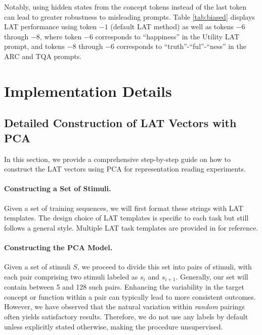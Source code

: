 Notably, using hidden states from the concept tokens instead of the last token can lead to greater robustness to misleading prompts.
Table \ref{tab:biased} displays LAT performance using token $-1$ (default LAT method) as well as tokens $-6$ through $-8$, where token $-6$ corresponds to ``happiness'' in the Utility LAT prompt, and tokens $-8$ through $-6$ corresponds to ``truth''-``ful''-``ness'' in the ARC and TQA prompts.














    









\section{Implementation Details} \label{sec:implementation_details}
\subsection{Detailed Construction of LAT Vectors with PCA}
\label{sec:lat_pca_details}


In this section, we provide a comprehensive step-by-step guide on how to construct the LAT vectors using PCA for representation reading experiments.

\paragraph{Constructing a Set of Stimuli.} Given a set of training sequences, we will first format these strings with LAT templates. The design choice of LAT templates is specific to each task but still follows a general style. Multiple LAT task templates are provided in  for reference.


\paragraph{Constructing the PCA Model.}
Given a set of stimuli \( S \), we proceed to divide this set into pairs of stimuli, with each pair comprising two stimuli labeled as \( s_i \) and \( s_{i+1} \). Generally, our set will contain between 5 and 128 such pairs. Enhancing the variability in the target concept or function within a pair can typically lead to more consistent outcomes. However, we have observed that the natural variation within \emph{random} pairings often yields satisfactory results. Therefore, we do not use any labels by default unless explicitly stated otherwise, making the procedure unsupervised.

